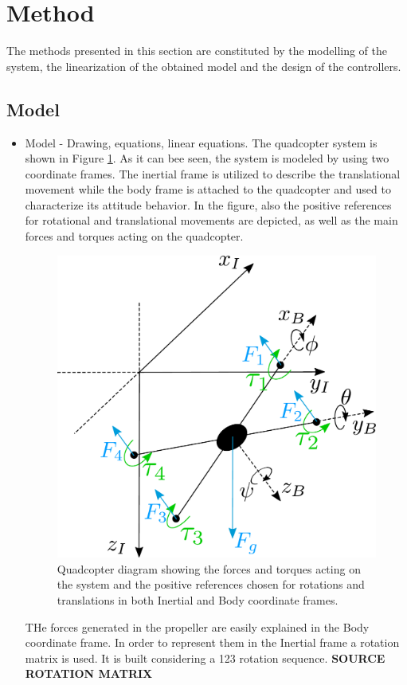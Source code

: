 \section{Method}
The methods presented in this section are constituted by the modelling of the system, the linearization of the obtained model and the design of the controllers.
\subsection{Model}
\begin{itemize}
\item Model - Drawing, equations, linear equations.
The quadcopter system is shown in Figure \ref{droneDiagram}. As it can bee seen, the system is modeled by using two coordinate frames. The inertial frame is utilized to describe the translational movement while the body frame is attached to the quadcopter and used to characterize its attitude behavior. In the figure, also the positive references for rotational and translational movements are depicted, as well as the main forces and torques acting on the quadcopter. 
\begin{figure}[H]
	\centering
	\includegraphics[scale=0.3]{droneDiagram}
	\caption{Quadcopter diagram showing the forces and torques acting on the system and the positive references chosen for rotations and translations in both Inertial and Body coordinate frames.}
	\label{droneDiagram}
\end{figure}
THe forces generated in the propeller are easily explained in the Body coordinate frame. In order to represent them in the Inertial frame a rotation matrix is used. It is built considering a 123 rotation sequence. \textbf{SOURCE ROTATION  MATRIX}
 

\end{itemize}
